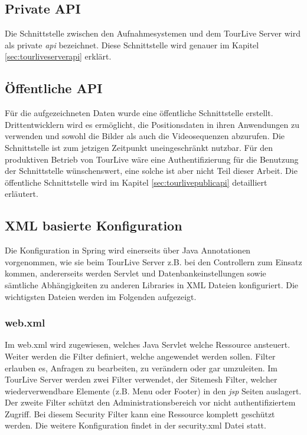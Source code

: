 \subsection{Private API}
Die Schnittstelle zwischen den Aufnahmesystemen und dem TourLive Server wird als private \textit{\gls{api}} bezeichnet. Diese Schnittstelle wird genauer im Kapitel \ref{sec:tourliveserverapi} erklärt.

\subsection{Öffentliche API}
Für die aufgezeichneten Daten wurde eine öffentliche Schnittstelle erstellt. Drittentwicklern wird es ermöglicht, die Positionsdaten in ihren Anwendungen zu verwenden und sowohl die Bilder als auch die Videosequenzen abzurufen. Die Schnittstelle ist zum jetzigen Zeitpunkt uneingeschränkt nutzbar. Für den produktiven Betrieb von TourLive wäre eine Authentifizierung für die Benutzung der Schnittstelle wünschenswert, eine solche ist aber nicht Teil dieser Arbeit. Die öffentliche Schnittstelle wird im Kapitel \ref{sec:tourlivepublicapi} detailliert erläutert.

\subsection{XML basierte Konfiguration}
Die Konfiguration in Spring wird einerseits über Java Annotationen vorgenommen, wie sie beim TourLive Server z.B. bei den Controllern zum Einsatz kommen, andererseits werden Servlet und Datenbankeinstellungen sowie sämtliche Abhängigkeiten zu anderen Libraries in XML Dateien konfiguriert. Die wichtigsten Dateien werden im Folgenden aufgezeigt.

\subsubsection{web.xml}
Im web.xml wird zugewiesen, welches Java Servlet welche Ressource ansteuert. Weiter werden die Filter definiert, welche angewendet werden sollen. Filter erlauben es, Anfragen zu bearbeiten, zu verändern oder gar umzuleiten. Im TourLive Server werden zwei Filter verwendet, der Sitemesh Filter, welcher wiederverwendbare Elemente (z.B. Menu oder Footer) in den \textit{\gls{jsp}} Seiten auslagert. Der zweite Filter schützt den Administrationsbereich vor nicht authentifiziertem Zugriff. Bei diesem Security Filter kann eine Ressource komplett geschützt werden. Die weitere Konfiguration findet in der security.xml Datei statt.

